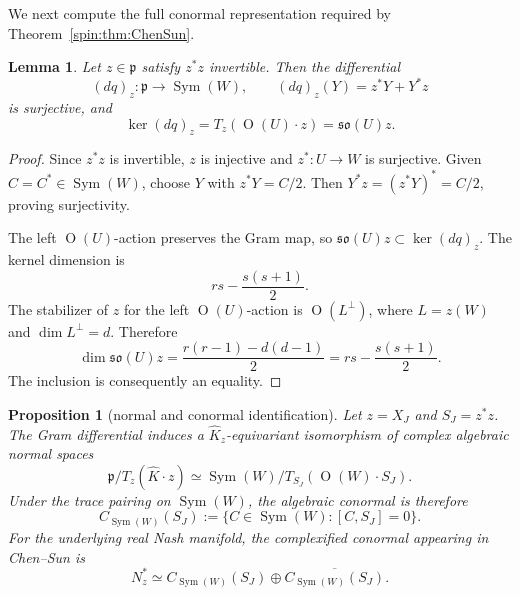 \documentclass[10pt,a4paper]{amsart}
\numberwithin{equation}{section}
\newtheorem{proposition}[theorem]{Proposition}
\newtheorem{lemma}[theorem]{Lemma}
\newcommand{\Or}{\operatorname{O}}
\newcommand{\Sym}{\operatorname{Sym}}
\newcommand{\fp}{\mathfrak p}
\begin{document}
We next compute the full conormal representation required by
Theorem~\ref{spin:thm:ChenSun}.

\begin{lemma}\label{spin:lem:dq}
Let $z\in\fp$ satisfy $z^*z$ invertible.  Then the differential
\[
  (dq)_z:\fp\longrightarrow\Sym(W),
  \qquad
  (dq)_z(Y)=z^*Y+Y^*z
\]
is surjective, and
\begin{equation}\label{spin:eq:kerdq}
  \ker(dq)_z=T_z(\Or(U)\cdot z)=\mathfrak{so}(U)z.
\end{equation}
\end{lemma}

\begin{proof}
Since $z^*z$ is invertible, $z$ is injective and $z^*:U\to W$ is surjective.
Given $C=C^*\in\Sym(W)$, choose $Y$ with $z^*Y=C/2$.  Then
$Y^*z=(z^*Y)^*=C/2$, proving surjectivity.

The left $\Or(U)$-action preserves the Gram map, so
$\mathfrak{so}(U)z\subset\ker(dq)_z$.  The kernel dimension is
\[
  rs-\frac{s(s+1)}2.
\]
The stabilizer of $z$ for the left $\Or(U)$-action is $\Or(L^\perp)$, where
$L=z(W)$ and $\dim L^\perp=d$.  Therefore
\[
  \dim \mathfrak{so}(U)z
  =\frac{r(r-1)-d(d-1)}2
  =rs-\frac{s(s+1)}2.
\]
The inclusion is consequently an equality.
\end{proof}

\begin{proposition}[normal and conormal identification]\label{spin:prop:normal-identification}
Let $z=X_J$ and $S_J=z^*z$.  The Gram differential induces a
$\widehat K_z$-equivariant isomorphism of complex algebraic normal spaces
\begin{equation}\label{spin:eq:normal-iso}
  \fp/T_z(\widehat K\cdot z)
  \simeq
  \Sym(W)/T_{S_J}(\Or(W)\cdot S_J).
\end{equation}
Under the trace pairing on $\Sym(W)$, the algebraic conormal is therefore
\begin{equation}\label{spin:eq:alg-conormal}
  C_{\Sym(W)}(S_J)
  :=\{C\in\Sym(W):[C,S_J]=0\}.
\end{equation}
For the underlying real Nash manifold, the complexified conormal appearing in
Chen--Sun is
\begin{equation}\label{spin:eq:real-conormal}
  N_z^*
  \simeq
  C_{\Sym(W)}(S_J)
  \oplus
  \overline{C_{\Sym(W)}(S_J)}.
\end{equation}
\end{proposition}
\end{document}
